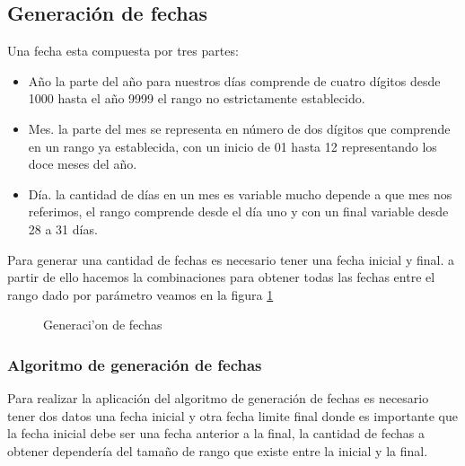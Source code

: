 \subsection{Generaci\'on de fechas}
Una fecha esta compuesta por tres partes:
\begin{itemize}
\item A\~no la parte del a\~no para nuestros d\'ias comprende de cuatro d\'igitos desde 1000 hasta el a\~no 9999 el rango no estrictamente establecido.
\item
Mes. la parte del mes se representa en n\'umero de dos d\'igitos que comprende en un rango ya establecida, con un inicio de 01 hasta 12 representando los doce meses del a\~no.
\item
 D\'ia. la cantidad de d\'ias en un mes es variable mucho depende a que mes nos referimos, el rango comprende desde el d\'ia uno y con un final variable desde 28 a 31 d\'ias.
\end{itemize}
Para generar una cantidad de fechas es necesario tener una fecha inicial y final. a partir de ello hacemos la combinaciones para obtener todas las fechas entre el rango dado por par\'ametro veamos en la figura \ref{fig:generacion de fechas}
\begin{figure}[H]
\centering
{}
\caption{Generaci'on de fechas} \label{fig:generacion de fechas}
\end{figure}
\subsubsection{Algoritmo de generaci\'on de fechas}
Para realizar la aplicaci\'on del algoritmo de generaci\'on de fechas es necesario tener dos datos una fecha inicial y otra fecha limite final donde es importante que la fecha inicial debe ser una fecha anterior a la final, la cantidad de fechas a obtener depender\'ia del tama\~no de rango que existe entre la inicial y la final.

